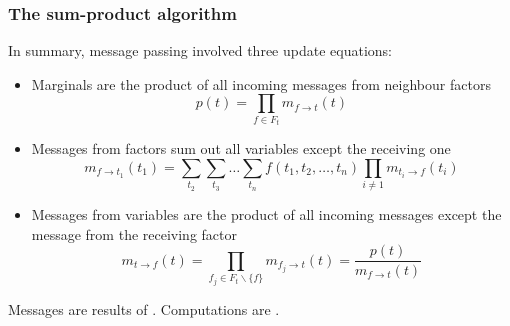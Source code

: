 \begin{frame}
\frametitle{The sum-product algorithm}

In summary, message passing involved three update equations:
\begin{itemize}
\item Marginals are the product of all incoming messages from neighbour factors
\[
p(t) = \prod_{f\in F_t}m_{f\rightarrow t}(t)
\]
\item Messages from factors sum out all variables except the receiving one
\[
m_{f\rightarrow {t_1}}(t_1) = \sum_{t_2}\sum_{t_3}\ldots\sum_{t_n}f(t_1,t_2,\ldots,t_n)
\prod_{i \neq 1} m_{t_i\rightarrow f}(t_i)
\]
\item Messages from variables are the product of all incoming messages 
except the message from the receiving factor
\[
m_{t\rightarrow f}(t) = \prod_{f_j\in F_t\backslash \{f\}}
m_{f_j\rightarrow t}(t) = \frac{p(t)}{m_{f\rightarrow t}(t)}
\]
\end{itemize}
Messages are results of . Computations are .

\end{frame}


